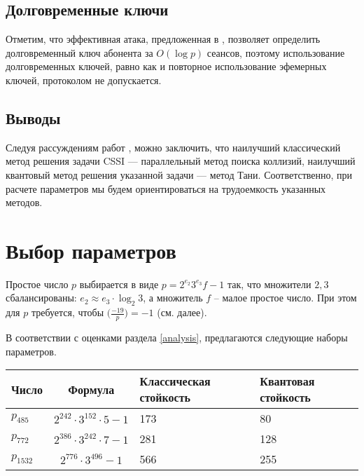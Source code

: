 \documentclass[a4paper,12pt]{article}
\theoremstyle{definition}
\begin{document}


\subsection*{Долговременные ключи}

Отметим, что эффективная атака, предложенная в \cite{sec}, позволяет определить долговременный ключ абонента за $O(\log p)$ сеансов, поэтому использование долговременных ключей,
равно как и повторное использование эфемерных ключей, протоколом не допускается.

\subsection*{Выводы}

Следуя рассуждениям работ \cite{Adj, FFF}, можно заключить, что наилучший классический метод решения задачи CSSI --- параллельный метод поиска коллизий, 
наилучший квантовый метод решения указанной задачи ---
метод Тани. Соответственно, при расчете параметров мы будем ориентироваться на трудоемкость указанных методов.


\section{Выбор параметров}\label{parampampam}

Простое число  $p$ выбирается в виде $p=2^{e_2}3^{e_3}f-1$ так, что множители $2,3$ сбалансированы:  $e_2\approx e_3 \cdot \log_2 3$, а множитель $f$ -- малое простое число. 
При этом для $p$ требуется, чтобы
$\big(\frac{-19}{p}\big) = -1$ (см. далее).

В соответствии с оценками раздела \ref{analysis}, предлагаются следующие наборы параметров. %

\begin{center}
 \begin{tabular}{|l|c|p{3cm}|p{3cm}|}
 \hline
 Число & Формула & Классическая стойкость & Квантовая стойкость \\
 \hline
 $p_{485}$ & $2^{242} \cdot 3^{152} \cdot 5 -1$ & 173  & 80 \\
 \hline
 $p_{772}$ & $2^{386} \cdot 3^{242} \cdot 7-1$ & 281 & 128 \\
 \hline
 $p_{1532}$ & $2^{776} \cdot 3^{496} -1 $ & 566 & 255 \\
 \hline
 \end{tabular}

\end{center}
\end{document}
